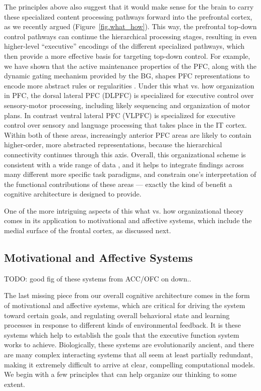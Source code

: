 \documentclass[11pt,twoside]{article}
\begin{document}
The principles above also suggest that it would make sense for the brain to carry these specialized content processing pathways forward into the prefrontal cortex, as we recently argued \cite{OReilly10} (Figure~\ref{fig.what_how}).  This way, the prefrontal top-down control pathways can continue the hierarchical processing stages, resulting in even higher-level ``executive'' encodings of the different specialized pathways, which then provide a more effective basis for targeting top-down control.  For example, we have shown that the active maintenance properties of the PFC, along with the dynamic gating mechanism provided by the BG, shapes PFC representations to encode more abstract rules or regularities \cite{RougierEtAl}.  Under this what vs. how organization in PFC, the dorsal lateral PFC (DLPFC) is specialized for executive control over sensory-motor processing, including likely sequencing and organization of motor plans.  In contrast ventral lateral PFC (VLPFC) is specialized for executive control over sensory and language processing that takes place in the IT cortex.  Within both of these areas, increasingly anterior PFC areas are likely to contain higher-order, more abstracted representations, because the hierarchical connectivity continues through this axis.  Overall, this organizational scheme is consistent with a wide range of data \cite{OReilly10}, and it helps to integrate findings across many different more specific task paradigms, and constrain one's interpretation of the functional contributions of these areas --- exactly the kind of benefit a cognitive architecture is designed to provide.

One of the more intriguing aspects of this what vs. how organizational theory comes in its application to motivational and affective systems, which include the medial surface of the frontal cortex, as discussed next.

\subsection{Motivational and Affective Systems}

TODO: good fig of these systems from ACC/OFC on down..

The last missing piece from our overall cognitive architecture comes in the form of motivational and affective systems, which are critical for driving the system toward certain goals, and regulating overall behavioral state and learning processes in response to different kinds of environmental feedback.  It is these systems which help to establish the goals that the executive function system works to achieve.  Biologically, these systems are evolutionarily ancient, and there are many complex interacting systems that all seem at least partially redundant, making it extremely difficult to arrive at clear, compelling computational models.  We begin with a few principles that can help organize our thinking to some extent.
\end{document}
